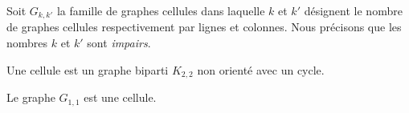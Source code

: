 Soit $G_{k,k'}$ la famille de graphes cellules dans laquelle $k$ et $k'$ d\'esignent le nombre de graphes cellules respectivement par lignes et colonnes.
Nous pr\'ecisons que les nombres $k$ et $k'$ sont {\em impairs}.

\begin{definition}
Une cellule est un graphe biparti $K_{2,2}$ non orient\'e avec un cycle.
\end{definition}

\begin{definition}
Le graphe $G_{1,1}$ est une cellule.
\end{definition}

